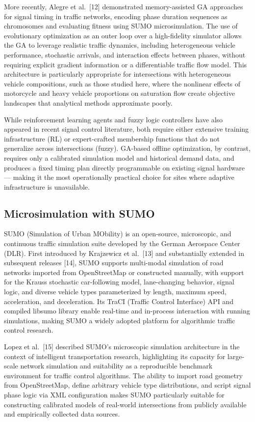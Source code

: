 \documentclass[a4paper,10pt]{article}
\begin{document}
	More recently, Alegre et al.~[12] demonstrated memory-assisted GA approaches for signal timing in traffic networks, encoding phase duration sequences as chromosomes and evaluating fitness using SUMO microsimulation. The use of evolutionary optimization as an outer loop over a high-fidelity simulator allows the GA to leverage realistic traffic dynamics, including heterogeneous vehicle performance, stochastic arrivals, and interaction effects between phases, without requiring explicit gradient information or a differentiable traffic flow model. This architecture is particularly appropriate for intersections with heterogeneous vehicle compositions, such as those studied here, where the nonlinear effects of motorcycle and heavy vehicle proportions on saturation flow create objective landscapes that analytical methods approximate poorly.

	While reinforcement learning agents and fuzzy logic controllers have also appeared in recent signal control literature, both require either extensive training infrastructure (RL) or expert-crafted membership functions that do not generalize across intersections (fuzzy). GA-based offline optimization, by contrast, requires only a calibrated simulation model and historical demand data, and produces a fixed timing plan directly programmable on existing signal hardware --- making it the most operationally practical choice for sites where adaptive infrastructure is unavailable.

	\subsection{Microsimulation with SUMO}
	
	SUMO (Simulation of Urban MObility) is an open-source, microscopic, and continuous traffic simulation suite developed by the German Aerospace Center (DLR). First introduced by Krajzewicz et al.~[13] and substantially extended in subsequent releases [14], SUMO supports multi-modal simulation of road networks imported from OpenStreetMap or constructed manually, with support for the Krauss stochastic car-following model, lane-changing behavior, signal logic, and diverse vehicle types parameterized by length, maximum speed, acceleration, and deceleration. Its TraCI (Traffic Control Interface) API and compiled libsumo library enable real-time and in-process interaction with running simulations, making SUMO a widely adopted platform for algorithmic traffic control research.
	
	Lopez et al.~[15] described SUMO's microscopic simulation architecture in the context of intelligent transportation research, highlighting its capacity for large-scale network simulation and suitability as a reproducible benchmark environment for traffic control algorithms. The ability to import road geometry from OpenStreetMap, define arbitrary vehicle type distributions, and script signal phase logic via XML configuration makes SUMO particularly suitable for constructing calibrated models of real-world intersections from publicly available and empirically collected data sources.
	
\end{document}
